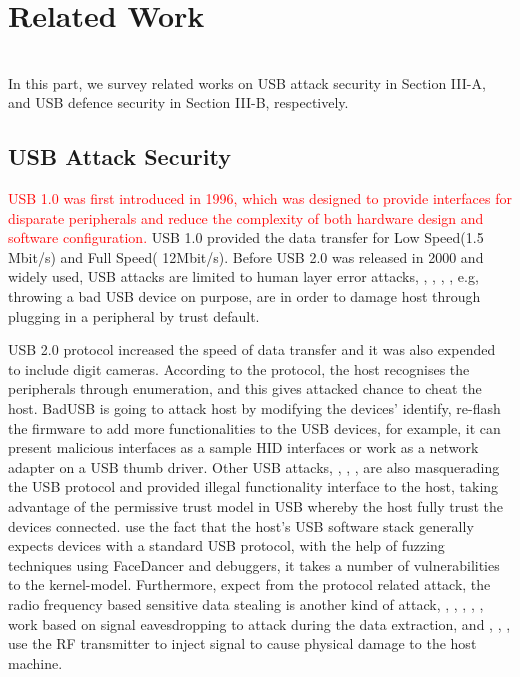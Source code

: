 \section{Related Work}
\label{sec:related_work}
\\
In this part, we survey related works on USB attack security in Section III-A, and USB defence security in Section III-B, respectively.
\subsection{USB Attack Security}
\textcolor{red}{USB 1.0\cite{usb01} was first introduced in 1996, which was designed to provide interfaces for disparate peripherals and reduce the complexity of both hardware design and software configuration\cite{sok}.} USB 1.0 provided the data transfer for Low Speed(1.5 Mbit/s) and Full Speed( 12Mbit/s). Before USB 2.0 was released in 2000 and widely used, USB attacks are limited to human layer error attacks, \cite{se}, \cite{goverment}, \cite{atkvec}, \cite{ueerreallydo}, e.g, throwing a bad USB device on purpose, are in order to damage host through plugging in a peripheral by trust default. 

USB 2.0 protocol increased the speed of data transfer and it was also expended to include digit cameras. According to the protocol, the host recognises the peripherals through enumeration, and this gives attacked chance to cheat the host. BadUSB\cite{badusb} is going to attack host by modifying the devices' identify, re-flash the firmware to add more functionalities to the USB devices, for example, it can present malicious interfaces as a sample HID interfaces or work as a network adapter on a USB thumb driver. Other USB attacks, \cite{rubber}, \cite{usbdriver}, \cite{usbbypassing}, \cite{iseeyou} are also masquerading the USB protocol and provided illegal functionality interface to the host, taking advantage of the permissive trust model in USB whereby the host fully trust the devices connected. \cite{syzkaller} use the fact that the host's USB software stack generally expects devices with a standard USB protocol, with the help of fuzzing techniques using FaceDancer \cite{facedancer} and debuggers, it takes a number of vulnerabilities to the kernel-model. Furthermore, expect from the protocol related attack, the radio frequency based sensitive data stealing is another kind of attack, \cite{smartphone} , \cite{poweremi}, \cite{badusbhub}, \cite{usbfinger}, \cite{side}, \cite{usbdriver} work based on signal eavesdropping to attack during the data extraction, and \cite{usbkiller}, \cite{cable}, \cite{usbee}, \cite{turnip} use the RF transmitter to inject signal to cause physical damage to the host machine.    

